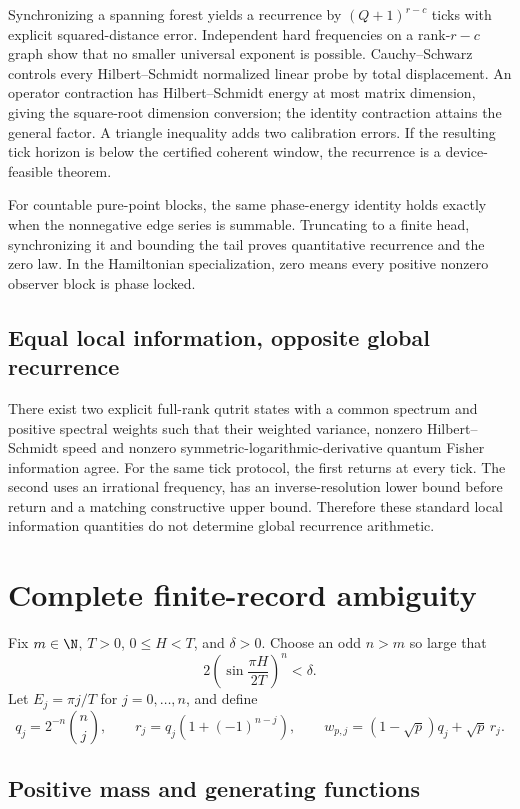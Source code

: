 Synchronizing a spanning forest yields a recurrence by
$(Q+1)^{r-c}$ ticks with explicit squared-distance error.  Independent hard
frequencies on a rank-$r-c$ graph show that no smaller universal exponent is
possible.  Cauchy--Schwarz controls every Hilbert--Schmidt normalized linear
probe by total displacement.  An operator contraction has Hilbert--Schmidt
energy at most matrix dimension, giving the square-root dimension conversion;
the identity contraction attains the general factor.  A triangle inequality
adds two calibration errors.  If the resulting tick horizon is below the
certified coherent window, the recurrence is a device-feasible theorem.

For countable pure-point blocks, the same phase-energy identity holds exactly
when the nonnegative edge series is summable.  Truncating to a finite head,
synchronizing it and bounding the tail proves quantitative recurrence and the
zero law.  In the Hamiltonian specialization, zero means every positive
nonzero observer block is phase locked.

\subsection{Equal local information, opposite global recurrence}

There exist two explicit full-rank qutrit states with a common spectrum and
positive spectral weights such that their weighted variance, nonzero
Hilbert--Schmidt speed and nonzero symmetric-logarithmic-derivative quantum
Fisher information agree.  For the same tick protocol, the first returns at
every tick.  The second uses an irrational frequency, has an
inverse-resolution lower bound before return and a matching constructive
upper bound.  Therefore these standard local information quantities do not
determine global recurrence arithmetic.

\section{Complete finite-record ambiguity}

Fix $m\in\N$, $T>0$, $0\le H<T$, and $\delta>0$.  Choose an odd
$n>m$ so large that
\[
 2\left(\sin\frac{\pi H}{2T}\right)^n<\delta.
\]
Let $E_j=\pi j/T$ for $j=0,\ldots,n$, and define
\[
 q_j=2^{-n}\binom{n}{j},\qquad
 r_j=q_j(1+(-1)^{n-j}),\qquad
 w_{p,j}=(1-\sqrt p)q_j+\sqrt p\,r_j.
\]

\subsection{Positive mass and generating functions}

